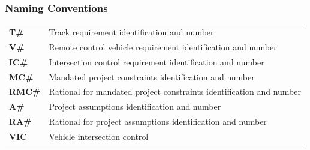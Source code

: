\documentclass [11pt]{article}
\begin{document}
\subsubsection{Naming Conventions}
\begin{longtable}{ |p{ }  p{ }|}  \hline
\textbf{T\#} &  Track requirement identification  and number \\ 

\cellcolor{tableCell}\textbf{V\#}  & \cellcolor{tableCell}Remote control vehicle requirement identification  and number \\ 

\textbf{IC\#} & Intersection control requirement identification  and number \\ 

\cellcolor{tableCell}\textbf{MC\#} &  \cellcolor{tableCell}Mandated project constraints identification and number \\ 

\textbf{RMC\#} & Rational for mandated project constraints identification and number\\ 

\cellcolor{tableCell}\textbf{A\#} & \cellcolor{tableCell}Project assumptions identification and number \\ 

\textbf{RA\#} & Rational for project assumptions identification and number \\ 

\cellcolor{tableCell}\textbf{VIC} & \cellcolor{tableCell}Vehicle intersection control \\ \hline


\end{longtable}
%
\end{document}
